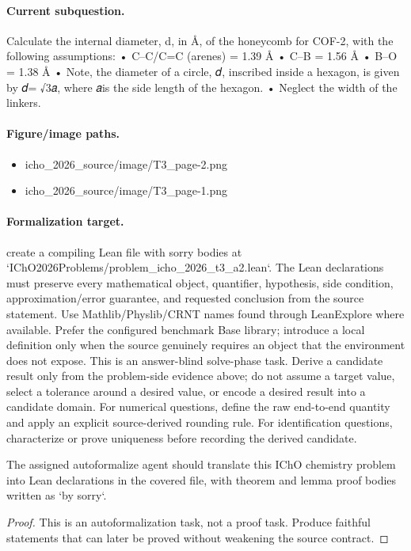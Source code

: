 \paragraph{Current subquestion.}
Calculate the internal diameter, d, in Å, of the honeycomb for COF-2, with the following assumptions: • C–C/C=C (arenes) = 1.39 Å • C–B = 1.56 Å • B–O = 1.38 Å • Note, the diameter of a circle, 𝑑, inscribed inside a hexagon, is given by 𝑑= √3𝑎, where 𝑎is the side length of the hexagon. • Neglect the width of the linkers.

\paragraph{Figure/image paths.}
\begin{itemize}
\item icho\_2026\_source/image/T3\_page-2.png
\item icho\_2026\_source/image/T3\_page-1.png
\end{itemize}

\paragraph{Formalization target.}
create a compiling Lean file with sorry bodies at `IChO2026Problems/problem\_icho\_2026\_t3\_a2.lean`.
The Lean declarations must preserve every mathematical object, quantifier, hypothesis, side condition, approximation/error guarantee, and requested conclusion from the source statement.
Use Mathlib/Physlib/CRNT names found through LeanExplore where available. Prefer the configured benchmark Base library; introduce a local definition only when the source genuinely requires an object that the environment does not expose.
This is an answer-blind solve-phase task. Derive a candidate result only from the problem-side evidence above; do not assume a target value, select a tolerance around a desired value, or encode a desired result into a candidate domain.
For numerical questions, define the raw end-to-end quantity and apply an explicit source-derived rounding rule. For identification questions, characterize or prove uniqueness before recording the derived candidate.

\begin{theorem}
\label{thm:physics:icho_2026_t3_a2:target}
The assigned autoformalize agent should translate this IChO chemistry problem into Lean declarations in the covered file, with theorem and lemma proof bodies written as `by sorry`.
\end{theorem}
\begin{proof}
This is an autoformalization task, not a proof task. Produce faithful statements that can later be proved without weakening the source contract.
\end{proof}
